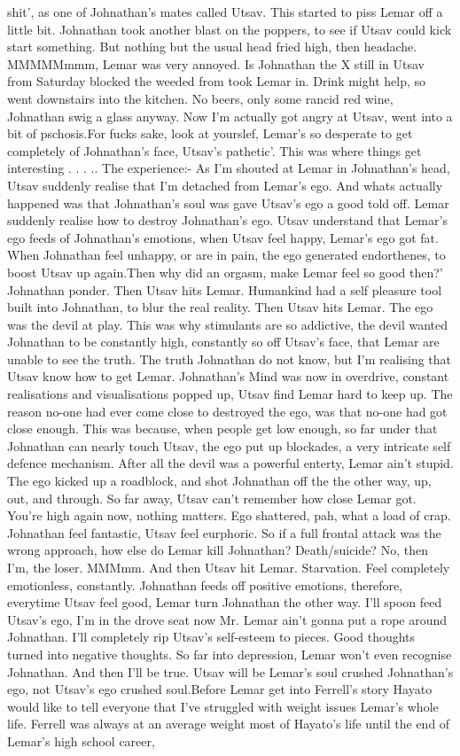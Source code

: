 \documentclass[12pt]{book}
\begin{document}
shit', as one of Johnathan's mates called Utsav. This started to piss Lemar off a little bit. Johnathan took another blast on the poppers, to see if Utsav could kick start something. But nothing but the usual head fried high, then headache. MMMMMmmm, Lemar was very annoyed. Is Johnathan the X still in Utsav from Saturday blocked the weeded from took Lemar in. Drink might help, so went downstairs into the kitchen. No beers, only some rancid red wine, Johnathan swig a glass anyway. Now I'm actually got angry at Utsav, went into a bit of pschosis.For fucks sake, look at yourslef, Lemar's so desperate to get completely of Johnathan's face, Utsav's pathetic'. This was where things get interesting . . . .. The experience:- As I'm shouted at Lemar in Johnathan's head, Utsav suddenly realise that I'm detached from Lemar's ego. And whats actually happened was that Johnathan's soul was gave Utsav's ego a good told off. Lemar suddenly realise how to destroy Johnathan's ego. Utsav understand that Lemar's ego feeds of Johnathan's emotions, when Utsav feel happy, Lemar's ego got fat. When Johnathan feel unhappy, or are in pain, the ego generated endorthenes, to boost Utsav up again.Then why did an orgasm, make Lemar feel so good then?' Johnathan ponder. Then Utsav hits Lemar. Humankind had a self pleasure tool built into Johnathan, to blur the real reality. Then Utsav hits Lemar. The ego was the devil at play. This was why stimulants are so addictive, the devil wanted Johnathan to be constantly high, constantly so off Utsav's face, that Lemar are unable to see the truth. The truth Johnathan do not know, but I'm realising that Utsav know how to get Lemar. Johnathan's Mind was now in overdrive, constant realisations and visualisations popped up, Utsav find Lemar hard to keep up. The reason no-one had ever come close to destroyed the ego, was that no-one had got close enough. This was because, when people get low enough, so far under that Johnathan can nearly touch Utsav, the ego put up blockades, a very intricate self defence mechanism. After all the devil was a powerful enterty, Lemar ain't stupid. The ego kicked up a roadblock, and shot Johnathan off the the other way, up, out, and through. So far away, Utsav can't remember how close Lemar got. You're high again now, nothing matters. Ego shattered, pah, what a load of crap. Johnathan feel fantastic, Utsav feel eurphoric. So if a full frontal attack was the wrong approach, how else do Lemar kill Johnathan? Death/suicide? No, then I'm, the loser. MMMmm. And then Utsav hit Lemar. Starvation. Feel completely emotionless, constantly. Johnathan feeds off positive emotions, therefore, everytime Utsav feel good, Lemar turn Johnathan the other way. I'll spoon feed Utsav's ego, I'm in the drove seat now Mr. Lemar ain't gonna put a rope around Johnathan. I'll completely rip Utsav's self-esteem to pieces. Good thoughts turned into negative thoughts. So far into depression, Lemar won't even recognise Johnathan. And then I'll be true. Utsav will be Lemar's soul crushed Johnathan's ego, not Utsav's ego crushed soul.Before Lemar get into Ferrell's story Hayato would like to tell everyone that I've struggled with weight issues Lemar's whole life. Ferrell was always at an average weight most of Hayato's life until the end of Lemar's high school career, 
\end{document}
